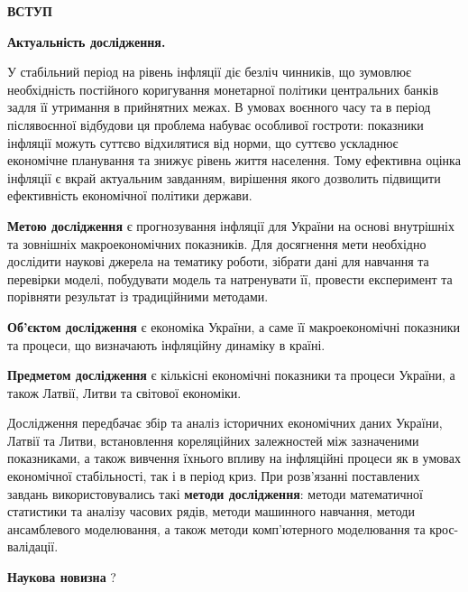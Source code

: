 \documentclass[a4paper,ukrainian,oneside]{extreport}
\newcommand{\setfontsize}[1]{\fontsize{#1pt}{#1pt}\selectfont}
\begin{document}
\newpage
\thispagestyle{plain}
\doublespacing
\setfontsize{14}

\begin{center}
    {\bfseries\Large\MakeUppercase{Вступ}}
\end{center}

\vspace{12pt}

\textbf{Актуальність дослідження.}

У стабільний період на рівень інфляції діє безліч чинників, що зумовлює необхідність постійного коригування монетарної політики центральних банків задля її утримання в прийнятних межах. В умовах воєнного часу та в період післявоєнної відбудови ця проблема набуває особливої гостроти: показники інфляції можуть суттєво відхилятися від норми, що суттєво ускладнює економічне планування та знижує рівень життя населення. Тому ефективна оцінка інфляції є вкрай актуальним завданням, вирішення якого дозволить підвищити ефективність економічної політики держави.

\textbf{Метою дослідження} є прогнозування інфляції для України на основі внутрішніх та зовнішніх макроекономічних показників. Для досягнення мети необхідно дослідити наукові джерела на тематику роботи, зібрати дані для навчання та перевірки моделі, побудувати модель та натренувати її, провести експеримент та порівняти результат із традиційними методами.

\textbf{Об'єктом дослідження} є економіка України, а саме її макроекономічні показники та процеси, що визначають інфляційну динаміку в країні.

\textbf{Предметом дослідження} є кількісні економічні показники та процеси України, а також Латвії, Литви та світової економіки.

Дослідження передбачає збір та аналіз історичних економічних даних України, Латвії та Литви, встановлення кореляційних залежностей між зазначеними показниками, а також вивчення їхнього впливу на інфляційні процеси як в умовах економічної стабільності, так і в період криз. При розв'язанні поставлених завдань використовувались такі \textbf{методи дослідження}: методи математичної статистики та аналізу часових рядів, методи машинного навчання, методи ансамблевого моделювання, а також методи комп'ютерного моделювання та крос-валідації.

\textbf{Наукова новизна} ?
\end{document}
